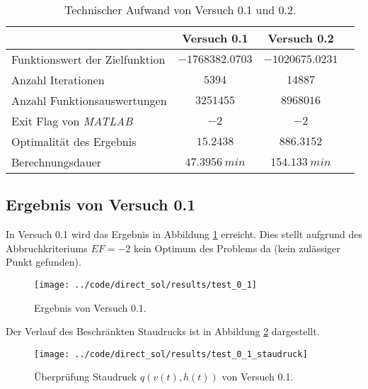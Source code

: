 \begin{table}[H]
    \centering
    \caption{Technischer Aufwand von Versuch 0.1 und 0.2.}\label{tab:Versuch0_TA}
    \begin{tabularx}{.9\textwidth}{Zccc}
        \toprule
         & \textbf{Versuch 0.1} & \textbf{Versuch 0.2} \\
        \midrule
        Funktionswert der Zielfunktion & $-1768382.0703$ & $-1020675.0231$ \\
        Anzahl Iterationen & $5394$ & $14887$ \\
        Anzahl Funktionsauswertungen & $3251455$ & $8968016$ \\
        Exit Flag von \textit{MATLAB} & $-2$ & $-2$ \\
        Optimalität des Ergebnis & $15.2438$ & $886.3152$ \\
        Berechnungsdauer & $47.3956 \ min$ & $154.133 \ min$ \\
        \bottomrule
    \end{tabularx}
\end{table}



\subsection{Ergebnis von Versuch 0.1}\label{kap:Versuch01}
In Versuch 0.1 wird das Ergebnis in Abbildung \ref{img:test_0_1} erreicht. Dies stellt aufgrund des Abbruchkriteriums $EF = -2$ kein Optimum des Problems da (kein zulässiger Punkt gefunden). 
\begin{figure}[H]
\begin{center}
\texttt{[image: ../code/direct\_sol/results/test\_0\_1]}
\caption{Ergebnis von Versuch 0.1.}\label{img:test_0_1}
\end{center}
\end{figure}
Der Verlauf des Beschränkten Staudrucks ist in Abbildung \ref{img:test_0_1_staudruck} dargestellt.
\begin{figure}[H]
\begin{center}
\texttt{[image: ../code/direct\_sol/results/test\_0\_1\_staudruck]}
\caption{Überprüfung Staudruck $q(v(t),h(t))$ von Versuch 0.1.}\label{img:test_0_1_staudruck}
\end{center}
\end{figure}





